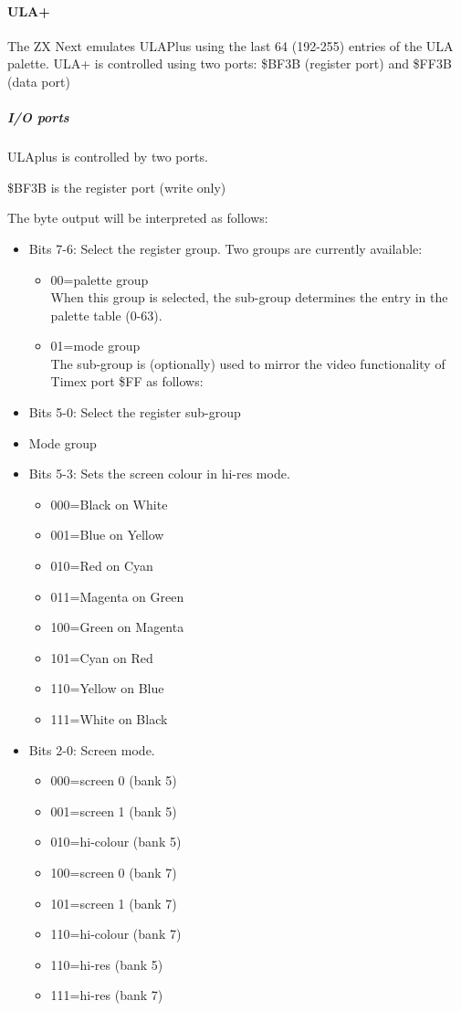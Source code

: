 \paragraph{ULA+}
The ZX Next emulates ULAPlus using the last 64 (192-255) entries of
the ULA palette. ULA+ is controlled using two ports: \$BF3B (register
port) and \$FF3B (data port)

\subparagraph{I/O ports}
ULAplus is controlled by two ports.

\$BF3B is the register port (write only)

The byte output will be interpreted as follows:
\begin{itemize}
\item Bits 7-6: Select the register group. Two groups are currently available:
  \begin{itemize}
  \item 00=palette group\\
    When this group is selected, the sub-group determines the entry in the
    palette table (0-63).
  \item 01=mode group\\
    The sub-group is (optionally) used to mirror the video functionality
    of Timex port \$FF as follows:
  \end{itemize}
\item Bits 5-0: Select the register sub-group
\item[] Mode group
\item Bits 5-3: Sets the screen colour in hi-res mode.
  \begin{itemize}
  \item 000=Black on White
  \item 001=Blue on Yellow
  \item 010=Red on Cyan
  \item 011=Magenta on Green
  \item 100=Green on Magenta
  \item 101=Cyan on Red
  \item 110=Yellow on Blue
  \item 111=White on Black
  \end{itemize}
\item Bits 2-0: Screen mode.
  \begin{itemize}
  \item 000=screen 0 (bank 5)
  \item 001=screen 1 (bank 5)
  \item 010=hi-colour (bank 5)
  \item 100=screen 0 (bank 7)
  \item 101=screen 1 (bank 7)
  \item 110=hi-colour (bank 7)
  \item 110=hi-res (bank 5)
  \item 111=hi-res (bank 7)
  \end{itemize}
\end{itemize}

